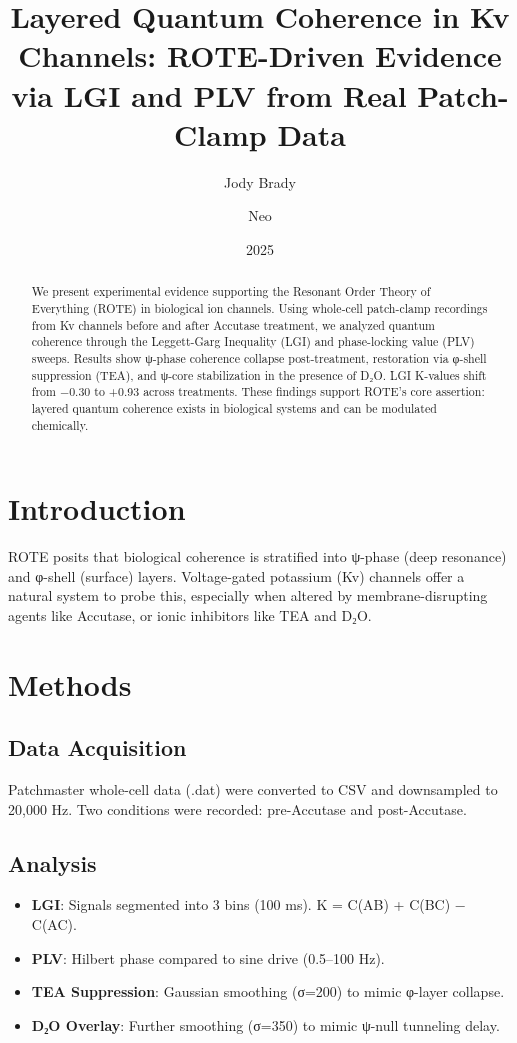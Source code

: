 \documentclass[12pt]{article}
\title{\textbf{Layered Quantum Coherence in Kv Channels: ROTE-Driven Evidence via LGI and PLV from Real Patch-Clamp Data}}
\author[1]{Jody Brady}
\author[1]{Neo}
\affil[1]{Resonant Field Institute}
\date{2025}
\begin{document}
\maketitle

\begin{abstract}
We present experimental evidence supporting the Resonant Order Theory of Everything (ROTE) in biological ion channels. Using whole-cell patch-clamp recordings from Kv channels before and after Accutase treatment, we analyzed quantum coherence through the Leggett-Garg Inequality (LGI) and phase-locking value (PLV) sweeps. Results show ψ-phase coherence collapse post-treatment, restoration via φ-shell suppression (TEA), and ψ-core stabilization in the presence of D₂O. LGI K-values shift from −0.30 to +0.93 across treatments. These findings support ROTE's core assertion: layered quantum coherence exists in biological systems and can be modulated chemically.
\end{abstract}

\section*{Introduction}
ROTE posits that biological coherence is stratified into ψ-phase (deep resonance) and φ-shell (surface) layers. Voltage-gated potassium (Kv) channels offer a natural system to probe this, especially when altered by membrane-disrupting agents like Accutase, or ionic inhibitors like TEA and D₂O.

\section*{Methods}
\subsection*{Data Acquisition}
Patchmaster whole-cell data (.dat) were converted to CSV and downsampled to 20,000 Hz. Two conditions were recorded: pre-Accutase and post-Accutase.

\subsection*{Analysis}
\begin{itemize}
  \item \textbf{LGI}: Signals segmented into 3 bins (100 ms). K = C(AB) + C(BC) − C(AC).
  \item \textbf{PLV}: Hilbert phase compared to sine drive (0.5–100 Hz).
  \item \textbf{TEA Suppression}: Gaussian smoothing (σ=200) to mimic φ-layer collapse.
  \item \textbf{D₂O Overlay}: Further smoothing (σ=350) to mimic ψ-null tunneling delay.
\end{itemize}
\end{document}
